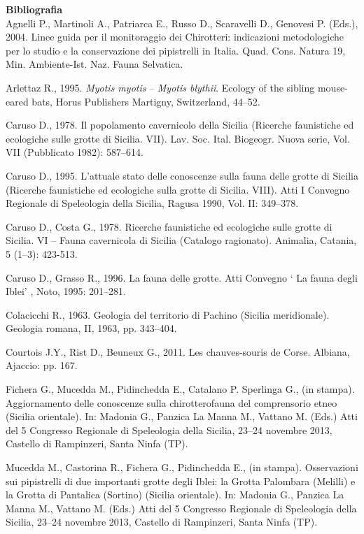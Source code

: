 \begin{multicols}{2}
\begin{small}
\vskip3mm

\noindent\textbf{Bibliografia}\\

Agnelli P., Martinoli A., Patriarca E., Russo D., Scaravelli D., Genovesi P. (Eds.), 2004. Linee guida per il monitoraggio dei Chirotteri: indicazioni metodologiche per lo studio e la conservazione dei pipistrelli in Italia. Quad. Cons. Natura 19, Min. Ambiente-Ist. Naz. Fauna Selvatica.

Arlettaz R., 1995. \emph{Myotis myotis} – \emph{Myotis blythii}. Ecology of the sibling mouse-eared bats, Horus Publishers Martigny, Switzerland, 44--52.

Caruso D., 1978. Il popolamento cavernicolo della Sicilia (Ricerche faunistiche ed ecologiche sulle grotte di Sicilia. VII). Lav. Soc. Ital. Biogeogr. Nuova serie, Vol. VII (Pubblicato 1982): 587--614. 

Caruso D., 1995. L’attuale stato delle conoscenze sulla fauna delle grotte di Sicilia (Ricerche faunistiche ed ecologiche sulla grotte di Sicilia. VIII). Atti I Convegno Regionale di Speleologia della Sicilia, Ragusa 1990, Vol. II: 349--378.

Caruso D., Costa G., 1978. Ricerche faunistiche ed ecologiche sulle grotte di Sicilia. VI – Fauna cavernicola di Sicilia (Catalogo ragionato). Animalia, Catania, 5 (1--3): 423-513.

Caruso D., Grasso R., 1996. La fauna delle grotte. Atti Convegno ` La fauna degli Iblei' , Noto, 1995: 201--281.

Colacicchi R., 1963. Geologia del territorio di Pachino (Sicilia meridionale). Geologia romana, II, 1963, pp. 343--404.

Courtois J.Y., Rist D., Beuneux G., 2011. Les chauves-souris de Corse. Albiana, Ajaccio: pp. 167.

Fichera G., Mucedda M., Pidinchedda E., Catalano P. Sperlinga G., (in stampa). Aggiornamento delle conoscenze sulla chirotterofauna del comprensorio etneo (Sicilia orientale). In: Madonia G., Panzica La Manna M., Vattano M. (Eds.) Atti del 5\degree{} Congresso Regionale di Speleologia della Sicilia, 23--24 novembre 2013, Castello di Rampinzeri, Santa Ninfa (TP).

Mucedda M., Castorina R., Fichera G., Pidinchedda E., (in stampa). Osservazioni sui pipistrelli di due importanti grotte degli Iblei: la Grotta Palombara (Melilli) e la Grotta di Pantalica (Sortino) (Sicilia orientale). In: Madonia G., Panzica La Manna M., Vattano M. (Eds.) Atti del 5\degree{} Congresso Regionale di Speleologia della Sicilia, 23--24 novembre 2013, Castello di Rampinzeri, Santa Ninfa (TP).


\end{small}
\end{multicols}

